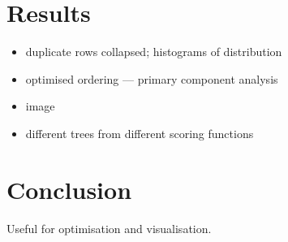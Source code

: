 \documentclass[twocolumn,a4paper,11pt,draft]{article}
\begin{document}
\section{Results}

\begin{itemize}

    \item duplicate rows collapsed; histograms of distribution

    \item optimised ordering --- primary component analysis

    \item image

    \item different trees from different scoring functions

\end{itemize}

\section{Conclusion}

Useful for optimisation and visualisation.

\appendix



\label{bibliography}
\end{document}

